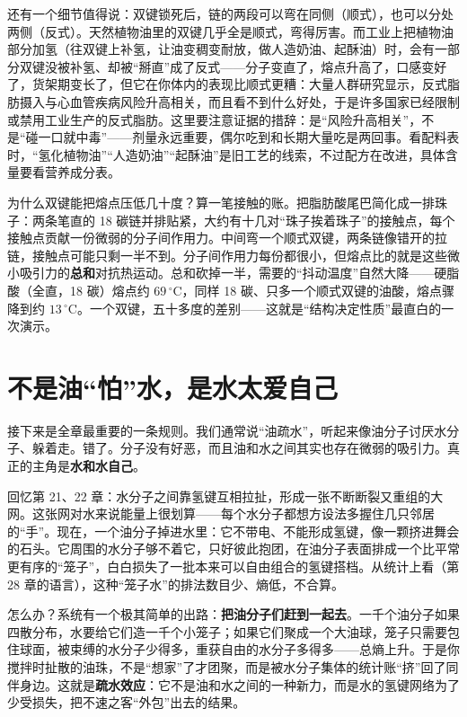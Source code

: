 还有一个细节值得说：双键锁死后，链的两段可以弯在同侧（顺式），也可以分处两侧（反式）。天然植物油里的双键几乎全是顺式，弯得厉害。而工业上把植物油部分加氢（往双键上补氢，让油变稠变耐放，做人造奶油、起酥油）时，会有一部分双键没被补氢、却被“掰直”成了反式——分子变直了，熔点升高了，口感变好了，货架期变长了，但它在你体内的表现比顺式更糟：大量人群研究显示，反式脂肪摄入与心血管疾病风险升高相关，而且看不到什么好处，于是许多国家已经限制或禁用工业生产的反式脂肪。这里要注意证据的措辞：是“风险升高相关”，不是“碰一口就中毒”——剂量永远重要，偶尔吃到和长期大量吃是两回事。看配料表时，“氢化植物油”“人造奶油”“起酥油”是旧工艺的线索，不过配方在改进，具体含量要看营养成分表。

\begin{qiaoliang}
为什么双键能把熔点压低几十度？算一笔接触的账。把脂肪酸尾巴简化成一排珠子：两条笔直的 18 碳链并排贴紧，大约有十几对“珠子挨着珠子”的接触点，每个接触点贡献一份微弱的分子间作用力。中间弯一个顺式双键，两条链像错开的拉链，接触点可能只剩一半不到。分子间作用力每份都很小，但熔点比的就是这些微小吸引力的\textbf{总和}对抗热运动。总和砍掉一半，需要的“抖动温度”自然大降——硬脂酸（全直，18 碳）熔点约 $69\,^{\circ}\mathrm{C}$，同样 18 碳、只多一个顺式双键的油酸，熔点骤降到约 $13\,^{\circ}\mathrm{C}$。一个双键，五十多度的差别——这就是“结构决定性质”最直白的一次演示。
\end{qiaoliang}

\section{不是油“怕”水，是水太爱自己}

接下来是全章最重要的一条规则。我们通常说“油疏水”，听起来像油分子讨厌水分子、躲着走。错了。分子没有好恶，而且油和水之间其实也存在微弱的吸引力。真正的主角是\textbf{水和水自己}。

回忆第 21、22 章：水分子之间靠氢键互相拉扯，形成一张不断断裂又重组的大网。这张网对水来说能量上很划算——每个水分子都想方设法多握住几只邻居的“手”。现在，一个油分子掉进水里：它不带电、不能形成氢键，像一颗挤进舞会的石头。它周围的水分子够不着它，只好彼此抱团，在油分子表面排成一个比平常更有序的“笼子”，白白损失了一批本来可以自由组合的氢键搭档。从统计上看（第 28 章的语言），这种“笼子水”的排法数目少、熵低，不合算。

怎么办？系统有一个极其简单的出路：\textbf{把油分子们赶到一起去}。一千个油分子如果四散分布，水要给它们造一千个小笼子；如果它们聚成一个大油球，笼子只需要包住球面，被束缚的水分子少得多，重获自由的水分子多得多——总熵上升。于是你搅拌时扯散的油珠，不是“想家”了才团聚，而是被水分子集体的统计账“挤”回了同伴身边。这就是\textbf{疏水效应}：它不是油和水之间的一种新力，而是水的氢键网络为了少受损失，把不速之客“外包”出去的结果。

